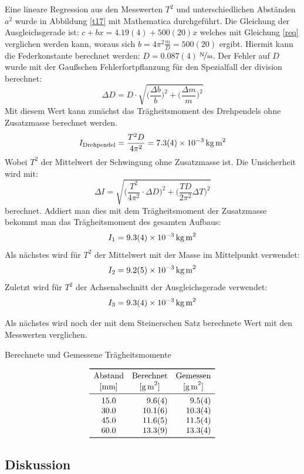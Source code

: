 \documentclass[11pt,a4paper]{article}
\begin{document}
Eine lineare Regression aus den Messwerten $T^2$ und unterschiedlichen Abständen $a^2$ wurde in Abbildung \ref{t17} mit Mathematica durchgeführt. Die Gleichung der Ausgleichsgerade ist: $c+bx=4.19(4) + 500(20) x$ welches mit Gleichung \eqref{req} verglichen werden kann, woraus sich $b = 4\pi^2 \frac{m}{D} = 500(20)$ ergibt. Hiermit kann die Federkonstante berechnet werden: $D = 0.087(4)$\,$\nicefrac{\textrm{N}}{\textrm{m}}$. Der Fehler auf $D$ wurde mit der Gaußschen Fehlerfortpflanzung für den Spezialfall der division berechnet:
$$\Delta D = D\cdot \sqrt{\bigg(\frac{\Delta b}{b}\bigg)^2+\bigg(\frac{\Delta m}{m}\bigg)^2}$$
Mit diesem Wert kann zunächst das Trägheitsmoment des Drehpendels ohne Zusatzmasse berechnet werden. 
$$I_{\textrm{Drehpendel}} = \frac{T^2D}{4\pi^2} = 7.3(4)\times 10^{-3}\,\textrm{kg\,m}^2$$
Wobei $T^2$ der Mittelwert der Schwingung ohne Zusatzmasse ist. Die Unsicherheit wird mit: 
$$\Delta I = \sqrt{\bigg(\frac{T^2}{4\pi^2}\cdot \Delta D\bigg)^2 + \bigg( \frac{TD}{2\pi^2}\Delta T\bigg)^2}$$
berechnet.
Addiert man dies mit dem Trägheitsmoment der Zusatzmasse bekommt man das Trägheitsmoment des gesamten Aufbaus:
$$I_1 = 9.3(4) \times 10^{-3}\,\textrm{kg\,m}^2$$
Als nächstes wird für $T^2$ der Mittelwert mit der Masse im Mittelpunkt verwendet:
$$I_2 = 9.2(5) \times 10^{-3}\,\textrm{kg\,m}^2$$
Zuletzt wird für $T^2$ der Achsenabschnitt der Ausgleichsgerade verwendet:
$$I_3 = 9.3(4) \times 10^{-3}\,\textrm{kg\,m}^2$$

Als nächstes wird noch der mit dem Steinerschen Satz berechnete Wert mit den Messwerten verglichen.

\begin{table}[h]
\caption{Berechnete und Gemessene Trägheitsmomente}
$$
\begin{array}{crr}
	\toprule 
	\textrm{Abstand} & \textrm{Berechnet} & \textrm{Gemessen}\\
	\textrm{[mm]} & \multicolumn{1}{c}{\textrm{[g\,m}^2]} & \multicolumn{1}{c}{\textrm{[g\,m}^2]}\\
	\midrule
	15.0 & 9.6(4) & 9.5(4)\\
	30.0 & 10.1(6) & 10.3(4)\\
	45.0 & 11.6(5) & 11.5(4)\\
	60.0 & 13.3(9) & 13.3(4) \\
	\bottomrule 
\end{array}
$$
\end{table}

\subsection{Diskussion}
\end{document}
